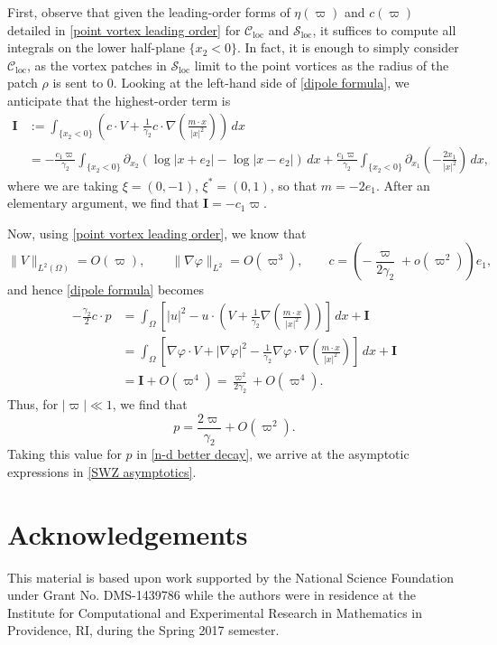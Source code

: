 \documentclass[11pt,reqno]{amsart}
\theoremstyle{plain}
\theoremstyle{remark}
\numberwithin{equation}{section}
\begin{document}
First, observe that given the leading-order forms of $\eta(\varpi)$ and $c(\varpi)$ detailed in \eqref{point vortex leading order} for $\mathscr{C}_{\mathrm{loc}}$ and $\mathscr{S}_{\mathrm{loc}}$, it suffices to compute all integrals on the lower half-plane $\{x_2 < 0 \}$.  In fact, it is enough to simply consider $\mathscr{C}_{\mathrm{loc}}$, as the vortex patches in $\mathscr{S}_{\mathrm{loc}}$ limit to the point vortices as the radius of the patch $\rho$ is sent to $0$.    Looking at the left-hand side of \eqref{dipole formula}, we anticipate that the highest-order term is 
\begin{align*}  
  \mathbf{I} &:= \int_{\{x_2 < 0\}} \left( c \cdot V + \frac{1}{\gamma_2} c \cdot \nabla \left( \frac{m \cdot x}{|x|^2} \right) \right) \, dx \\
  &= -\frac{c_1 \varpi}{\gamma_2} \int_{\{x_2 < 0\}} \partial_{x_2} \left(  \log{|x+e_2|} -  \log{|x-e_2|} \right) \, dx 
  + \frac{c_1 \varpi}{\gamma_2} \int_{\{x_2 < 0 \}} \partial_{x_1} \left( - \frac{2 x_1}{|x|^2} \right) \, dx, 
\end{align*}
where we are taking $\xi = (0,-1)$, $\xi^* = (0,1)$, so that $m = -2 e_1$.  After an elementary argument, we find that $\mathbf{I} = - c_1 \varpi$.

Now, using \eqref{point vortex leading order}, we know that 
\[ \| V \|_{L^2(\Omega)} = O(\varpi), \qquad \| \nabla \varphi \|_{L^2} = O(\varpi^3), \qquad c = \left(-\frac{\varpi}{2 \gamma_2} + o(\varpi^2) \right) e_1,\]
and hence \eqref{dipole formula} becomes 
\begin{align*}
-\frac{\gamma_2}{2}  c \cdot p & = \int_{\Omega} \left[ |u|^2 - u \cdot \left( V + \frac{1}{\gamma_2} \nabla \left( \frac{m \cdot x}{|x|^2} \right) \right)  \right] \, dx + \mathbf{I} \\
& = \int_{\Omega} \left[ \nabla \varphi \cdot V + |\nabla \varphi|^2 -  \frac{1}{\gamma_2}  \nabla \varphi \cdot \nabla \left( \frac{m \cdot x}{|x|^2} \right)   \right] \, dx + \mathbf{I} \\
& = \mathbf{I} + O(\varpi^4) = \frac{\varpi^2}{2 \gamma_2} + O(\varpi^4).
\end{align*}
Thus, for $|\varpi| \ll 1$, we find that 
\[ p = \frac{2\varpi}{\gamma_2} + O(\varpi^2).\]
Taking this value for $p$ in \eqref{n-d better decay}, we arrive at the asymptotic expressions in  \eqref{SWZ asymptotics}.


\section*{Acknowledgements}
This material is based upon work supported by the National Science Foundation under Grant No. DMS-1439786 while the authors were in residence at the Institute for Computational and Experimental Research in Mathematics in Providence, RI, during the Spring 2017 semester.
\end{document}

